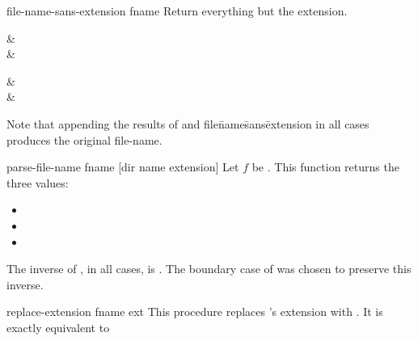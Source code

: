 \begin{defundesc} {file-name-sans-extension} {fname} \str
    Return everything but the extension.
%
    \begin{exampletable}
                &    \\
            &  \\
              {}
    \end{exampletable}
%
    \begin{exampletable}
          &     \\
         &    \\[2ex]
        {}
    \end{exampletable}

    Note that appending the results of  and 
    {\ttt file\=name\=sans\=extension} in all cases produces the original file-name.
\end{defundesc}


\begin{defundesc} {parse-file-name} {fname} {[dir name extension]}
    Let $f$ be .
    This function returns the three values:
    \begin{itemize}
    \item {}
    \item {}
    \item {}
    \end{itemize}
    The inverse of , in all cases, is .
    The boundary case of \ex{/} was chosen to preserve this inverse.
\end{defundesc}

\begin{defundesc} {replace-extension} {fname ext} \str
    This procedure replaces 's extension with .
    It is exactly equivalent to 
\end{defundesc}

